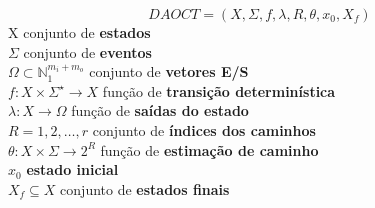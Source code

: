 \begin{frame}
\begin{definition}[DAOCT]
  \label{def:daoct}
  \small
  \[ DAOCT = (X,\Sigma,f,\lambda,R,\theta, x_0,X_f)\]
  \indent X conjunto de \textbf{estados} \\
  \indent $\Sigma$ conjunto de \textbf{eventos}\\
  \indent $\Omega \subset \mathbb{N}_1^{m_i+m_o} $ conjunto de \textbf{vetores E/S}\\
  \indent $f:  X \times \Sigma^\star \rightarrow X$ função de  \textbf{transição determinística}\\
  \indent $\lambda : X \rightarrow \Omega$ função de  \textbf{saídas do estado}\\
  \indent $R = {1,2,\dots,r}$ conjunto de \textbf{índices dos caminhos}\\
  \indent $\theta : X \times \Sigma \rightarrow 2^R$ função de \textbf{estimação
    de caminho}\\
  \indent $x_0$ \textbf{estado inicial} \\
  \indent $X_f \subseteq X $ conjunto de \textbf{estados finais}
\end{definition}
\end{frame}

